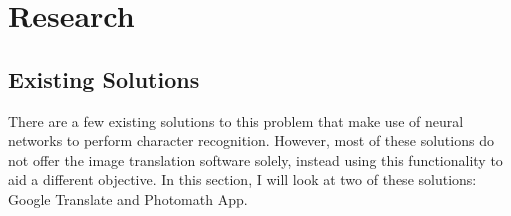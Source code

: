 \documentclass{report}
\begin{document}
\newpage

\section{Research}

\subsection{Existing Solutions}

There are a few existing solutions to this problem that make use of neural networks to perform character recognition. However, most of these solutions do not offer the image translation software solely, instead using this functionality to aid a different objective. In this section, I will look at two of these solutions: Google Translate and Photomath App.
\end{document}
